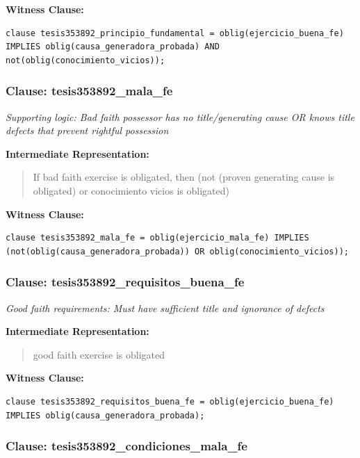\documentclass[11pt,a4paper]{article}
\begin{document}
\textbf{Witness Clause:}

\begin{lstlisting}[style=witnessstyle, language=Witness]
clause tesis353892_principio_fundamental = oblig(ejercicio_buena_fe) IMPLIES oblig(causa_generadora_probada) AND not(oblig(conocimiento_vicios));
\end{lstlisting}

\subsubsection{Clause: tesis353892\_mala\_fe}

\textit{Supporting logic: Bad faith possessor has no title/generating cause OR knows title defects that prevent rightful possession}

\textbf{Intermediate Representation:}

\begin{quote}
If bad faith exercise is obligated, then (not (proven generating cause is obligated) or conocimiento vicios is obligated)
\end{quote}

\textbf{Witness Clause:}

\begin{lstlisting}[style=witnessstyle, language=Witness]
clause tesis353892_mala_fe = oblig(ejercicio_mala_fe) IMPLIES (not(oblig(causa_generadora_probada)) OR oblig(conocimiento_vicios));
\end{lstlisting}

\subsubsection{Clause: tesis353892\_requisitos\_buena\_fe}

\textit{Good faith requirements: Must have sufficient title and ignorance of defects}

\textbf{Intermediate Representation:}

\begin{quote}
good faith exercise is obligated
\end{quote}

\textbf{Witness Clause:}

\begin{lstlisting}[style=witnessstyle, language=Witness]
clause tesis353892_requisitos_buena_fe = oblig(ejercicio_buena_fe) IMPLIES oblig(causa_generadora_probada);
\end{lstlisting}

\subsubsection{Clause: tesis353892\_condiciones\_mala\_fe}
\end{document}
